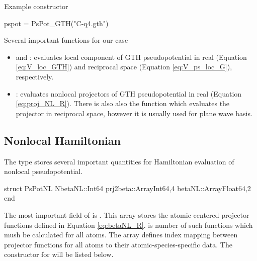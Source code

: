 Example constructor
\begin{juliacode}
pspot = PsPot_GTH("C-q4.gth")
\end{juliacode}

Several important functions for our case
\begin{itemize}
\item {} and : evaluates local component
  of GTH pseudopotential in real (Equation \eqref{eq:V_loc_GTH})
  and reciprocal space (Equation \eqref{eq:V_ps_loc_G}), respectively.
\item {}: evaluates nonlocal projectors
  of GTH pseudopotential in real (Equation \eqref{eq:proj_NL_R}).
  There is also also the function  which evaluates the
  projector in reciprocal space, however it is usually used for plane wave basis.
\end{itemize}


\subsection{Nonlocal Hamiltonian}

The type  stores several important quantities for Hamiltonian
evaluation of nonlocal pseudopotential.
%
\begin{juliacode}
struct PsPotNL
  NbetaNL::Int64
  prj2beta::Array{Int64,4}
  betaNL::Array{Float64,2}
end
\end{juliacode}
%
The most important field of  is . This array stores
the atomic centered projector functions defined in Equation \eqref{eq:betaNL_R}.
 is number of such functions which mush be calculated for
all atoms. The array  defines index mapping between projector
functions for all atoms to their atomic-species-specific data. The constructor
for  will be listed below.

